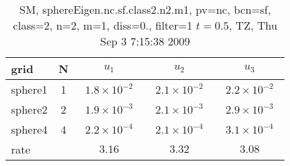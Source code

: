 \begin{table}[hbt]\tableFont %
\begin{center}
\begin{tabular}{|l|c|c|c|c|} \hline 
grid  & N &  $u_1$ & $u_2$ & $u_3$  \\ \hline 
             sphere1 &     1 & ~$1.8\times10^{ -2}$~ & ~$2.1\times10^{ -2}$~ & ~$2.2\times10^{ -2}$~  \\ \hline
             sphere2 &     2 & ~$1.9\times10^{ -3}$~ & ~$2.1\times10^{ -3}$~ & ~$2.9\times10^{ -3}$~  \\ \hline
             sphere4 &     4 & ~$2.2\times10^{ -4}$~ & ~$2.1\times10^{ -4}$~ & ~$3.1\times10^{ -4}$~  \\ \hline
    rate             &       &       $3.16$          &       $3.32$          &       $3.08$           \\ \hline
\end{tabular}
\caption{SM, sphereEigen.nc.sf.class2.n2.m1, pv=nc, bcn=sf, class=2, n=2, m=1, diss=0., filter=1 $t=0.5$,  TZ, Thu Sep  3  7:15:38 2009}\label{table:sphereEigen.nc.sf.class2.n2.m1}
\end{center}
\end{table}
